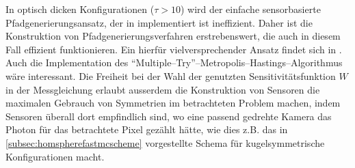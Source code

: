 	In optisch dicken Konfigurationen ($\tau>10$) wird der einfache sensorbasierte Pfadgenerierungsansatz, der in \pirate implementiert ist ineffizient. Daher ist die Konstruktion von Pfadgenerierungsverfahren erstrebenswert, die auch in diesem Fall effizient funktionieren. Ein hierfür vielversprechender Ansatz findet sich in \citep{Laszlo:2005p11056,DAldous:1994p11528,Grassberger:2002p10876}. Auch die Implementation des ``Multiple--Try''--Metropolis--Hastings--Algorithmus \citep{Liu:2000p8427} wäre interessant. Die Freiheit bei der Wahl der genutzten Sensitivitätsfunktion $W$ in der Messgleichung erlaubt ausserdem die Konstruktion von Sensoren die maximalen Gebrauch von Symmetrien im betrachteten Problem machen, indem Sensoren überall dort empfindlich sind, wo eine passend gedrehte Kamera das Photon für das betrachtete Pixel gezählt hätte, wie dies z.B. das in \ref{subsec:homspherefastmcscheme} vorgestellte Schema für kugelsymmetrische Konfigurationen macht.

	